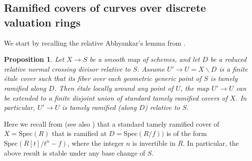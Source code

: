 \documentclass[11pt, letterpaper]{amsart}
\theoremstyle{plain}
\newtheorem{proposition}[theorem]{Proposition}
\theoremstyle{definition}
\newcommand{\IP}{\mathbb{P}}
\newcommand{\sC}{\mathcal{C}}
\newcommand{\Spec}{\mathrm{Spec}}
\newcommand{\<}{\langle}
\renewcommand{\>}{\rangle}
\newcommand{\sL}{\mathcal{L}}
\newcommand{\sO}{\mathcal{O}}
\newcommand{\sY}{\mathcal{Y}}
\begin{document}

\subsection{Ramified covers of curves over discrete valuation rings}
\label{sec: ramified covers}
We start by recalling the relative Abhyankar's lemma from \cite{SGA1}.
\begin{proposition}\cite[Expos\'e XIII, Prop.\ 5.5]{SGA1}
	\label{prop:relative_Abhy}
	Let $X\to S$ be a smooth map of schemes, and let $D$ be a reduced relative normal crossing divisor relative to $S$.
	Assume $U'\to U=X \smallsetminus D$ is a finite \'etale cover such that its fiber over each geometric generic point of $S$ is tamely ramified along $D$.
	Then \'etale locally around any point of $U$, the map $U'\to U$ can be extended to a finite disjoint union of standard tamely ramified covers of $X$.
	In particular, $U'\to U$ is tamely ramified (along $D$) relative to $S$.
\end{proposition}
Here we recall from \cite[Expos\'e XIII, 5.3.0]{SGA1} (see also \cite[\href{https://stacks.math.columbia.edu/tag/0EYF}{Tag 0EYF}]{stacks-project}) that a standard tamely ramified cover of $X=\Spec(R)$ that is ramified at $D=\Spec(R/f))$ is of the form $\Spec(R[t]/t^n-f)$, where the integer $n$ is invertible in $R$.
In particular, the above result is stable under any base change of $S$.
\end{document}
